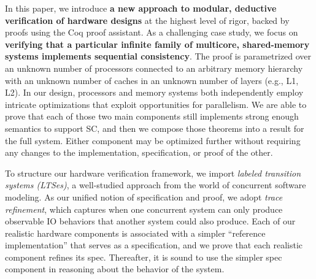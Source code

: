 

In this paper, we introduce \textbf{a new approach to modular,
  deductive verification of hardware designs} at the highest level of
rigor, backed by proofs using the Coq proof assistant.  As a
challenging case study, we focus on \textbf{verifying that a
  particular infinite family of multicore, shared-memory systems
  implements sequential consistency}.  The proof is parametrized over
an unknown number of processors connected to an arbitrary memory
hierarchy with an unknown number of caches in an unknown number of
layers (e.g., L1, L2).  In our design, processors and memory systems
both independently employ intricate optimizations that exploit
opportunities for parallelism.  We are able to prove that each of
those two main components still implements strong enough semantics to
support SC, and then we compose those theorems into a result for the
full system.  Either component may be optimized further without
requiring any changes to the implementation, specification, or proof
of the other.

To structure our hardware verification framework, we import
\emph{labeled transition systems (LTSes)}, a well-studied approach from the
world of concurrent software modeling.  As our unified notion of
specification and proof, we adopt \emph{trace refinement}, which
captures when one concurrent system can only produce observable IO
behaviors that another system could also produce.  Each of our
realistic hardware components is associated with a simpler ``reference
implementation'' that serves as a specification, and we prove that
each realistic component refines its spec.  Thereafter, it is sound to
use the simpler spec component in reasoning about the behavior of the
system.

